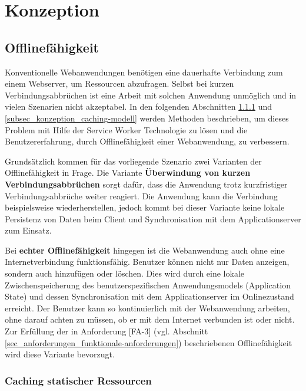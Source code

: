 \chapter{Konzeption}
\label{sec_konzeption}

\section{Offlinefähigkeit}
\label{sec_konzeption_offline}

Konventionelle Webanwendungen benötigen eine dauerhafte Verbindung zum einem Webserver, um Ressourcen abzufragen. Selbst bei kurzen Verbindungsabbrüchen ist eine Arbeit mit solchen Anwendung unmöglich und in vielen Szenarien nicht akzeptabel. In den folgenden Abschnitten \ref{subsec_konzept_caching-statische-ressourcen} und \ref{subsec_konzeption_caching-modell} werden Methoden beschrieben, um dieses Problem mit Hilfe der Service Worker Technologie zu lösen und die Benutzererfahrung, durch Offlinefähigkeit einer Webanwendung, zu verbessern. 

Grundsätzlich kommen für das vorliegende Szenario zwei Varianten der Offlinefähigkeit in Frage. Die Variante \textbf{Überwindung von kurzen Verbindungsabbrüchen} sorgt dafür, dass die Anwendung trotz kurzfristiger Verbindungsabbrüche weiter reagiert. Die Anwendung kann die Verbindung beispielsweise wiederherstellen, jedoch kommt bei dieser Variante keine lokale Persistenz von Daten beim Client und Synchronisation mit dem Applicationserver zum Einsatz. 

Bei \textbf{\glqq{}echter\grqq{} Offlinefähigkeit} hingegen ist die Webanwendung auch ohne eine Internetverbindung funktionsfähig. Benutzer können nicht nur Daten anzeigen, sondern auch hinzufügen oder löschen. Dies wird durch eine lokale Zwischenspeicherung des benutzerspezifischen Anwendungsmodels (\glqq{}Application State\grqq{}) und dessen Synchronisation mit dem Applicationserver im Onlinezustand erreicht. Der Benutzer kann so kontinuierlich mit der Webanwendung arbeiten, ohne darauf achten zu müssen, ob er mit dem Internet verbunden ist oder nicht. \\
Zur Erfüllung der in Anforderung [FA-3] (vgl. Abschnitt \ref{sec_anforderungen_funktionale-anforderungen}) beschriebenen Offlinefähigkeit wird diese Variante bevorzugt.

\subsection{Caching statischer Ressourcen}
\label{subsec_konzept_caching-statische-ressourcen}

